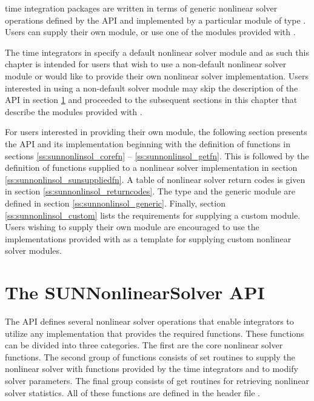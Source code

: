 {\sundials} time integration packages are written in terms of generic nonlinear
solver operations defined by the {\sunnonlinsol} API and implemented by a
particular {\sunnonlinsol} module of type \noindent{}.
Users can supply their own {\sunnonlinsol} module, or use one of the modules
provided with {\sundials}.

The time integrators in {\sundials} specify a default nonlinear solver module
and as such this chapter is intended for users that wish to use a non-default
nonlinear solver module or would like to provide their own nonlinear solver
implementation. Users interested in using a non-default solver module may skip
the description of the {\sunnonlinsol} API in section \ref{s:sunnonlinsol_api}
and proceeded to the subsequent sections in this chapter that describe the
{\sunnonlinsol} modules provided with {\sundials}.

For users interested in providing their own {\sunnonlinsol} module, the
following section presents the {\sunnonlinsol} API and its implementation
beginning with the definition of {\sunnonlinsol} functions in sections
\ref{ss:sunnonlinsol_corefn} -- \ref{ss:sunnonlinsol_getfn}. This is followed by
the definition of functions supplied to a nonlinear solver implementation in
section \ref{ss:sunnonlinsol_sunsuppliedfn}. A table of nonlinear solver return
codes is given in section \ref{ss:sunnonlinsol_returncodes}. The
 type and the generic {\sunnonlinsol} module are defined
in section \ref{ss:sunnonlinsol_generic}. Finally, section
\ref{ss:sunnonlinsol_custom} lists the requirements for supplying a custom
{\sunnonlinsol} module. Users wishing to supply their own {\sunnonlinsol} module
are encouraged to use the {\sunnonlinsol} implementations provided with
{\sundials} as a template for supplying custom nonlinear solver modules.


\section{The SUNNonlinearSolver API}
\label{s:sunnonlinsol_api}

The {\sunnonlinsol} API defines several nonlinear solver operations that enable
{\sundials} integrators to utilize any {\sunnonlinsol} implementation that
provides the required functions. These functions can be divided into three
categories. The first are the core nonlinear solver functions. The second group
of functions consists of set routines to supply the nonlinear solver with
functions provided by the {\sundials} time integrators and to modify solver
parameters. The final group consists of get routines for retrieving nonlinear
solver statistics. All of these functions are defined in the header file
.

